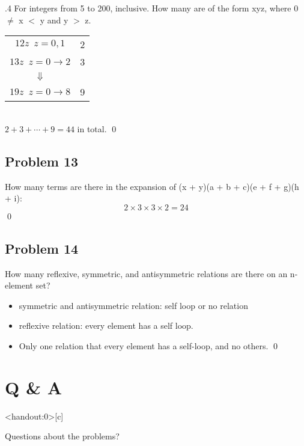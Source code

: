 \documentclass[handout]{beamer}
\begin{document}
        \begin{frame}[c]{\subsecname.4}
            For integers from 5 to 200, inclusive. How many are of the form xyz, where 0 $\neq$ x $<$ y and y $>$ z.\\$\;$\\\pause
            \centering
                \begin{tabular}{cr}
                     $ 12z\;\ z = 0,1$               & 2 \\
                     $ 13z\;\ z = 0 \rightarrow 2$   & 3 \\
                     $ \Downarrow $                  &  \\
                     $ 19z\;\ z = 0 \rightarrow 8$   & 9 
                \end{tabular}\\$\;$\\\pause
                $2+3+\cdots+9=44$ in total. \qed
        \end{frame}



    \subsection{Problem 13}
    
        \begin{frame}[c]{\subsecname}
            How many terms are there in the expansion of (x + y)(a + b + c)(e + f + g)(h + i):\\$\;$\\\pause
            \[2\times3\times3\times2=24\] \qed
        \end{frame}



    \subsection{Problem 14}
    
        \begin{frame}[c]{\subsecname}
            How many reflexive, symmetric, and antisymmetric relations are there on an n-element set?\\$\;$\\\pause
            \begin{itemize}
            \item symmetric and antisymmetric relation: self loop or no relation
            \item reflexive relation: every element has a self loop.
            \item Only one relation that every element has a self-loop, and no others. \qed
            \end{itemize}
        \end{frame}
        
        
        
\section*{Q \& A}

    \begin{frame}<handout:0>[c]{\secname}
        \centerline{\Huge{Questions about the problems?}}
    \end{frame}
    
    
    
\end{document}
